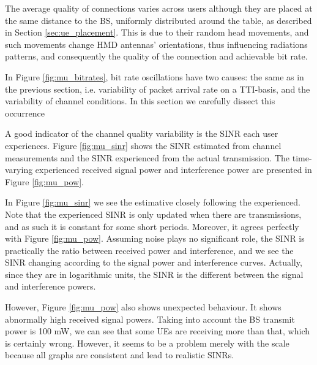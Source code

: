 The average quality of connections varies across users although they are placed at the same distance to the BS, uniformly distributed around the table, as described in Section \ref{sec:ue_placement}. This is due to their random head movements, and such movements change \acs{HMD} antennas' orientations, thus influencing radiations patterns, and consequently the quality of the connection and achievable bit rate.


In Figure \ref{fig:mu_bitrates}, bit rate oscillations have two causes: the same as in the previous section, i.e. variability of packet arrival rate on a TTI-basis, and the variability of channel conditions. In this section we carefully dissect this occurrence 

A good indicator of the channel quality variability is the SINR each user experiences. Figure \ref{fig:mu_sinr} shows the SINR estimated from channel measurements and the SINR experienced from the actual transmission. The time-varying experienced received signal power and interference power are presented in Figure \ref{fig:mu_pow}.




\vspace{.4cm}

In Figure \ref{fig:mu_sinr} we see the estimative closely following the experienced. Note that the experienced SINR is only updated when there are transmissions, and as such it is constant for some short periods. Moreover, it agrees perfectly with Figure \ref{fig:mu_pow}. Assuming noise plays no significant role, the SINR is practically the ratio between received power and interference, and we see the SINR changing according to the signal power and interference curves. Actually, since they are in logarithmic units, the SINR is the different between the signal and interference powers.

However, Figure \ref{fig:mu_pow} also shows unexpected behaviour. It shows abnormally high received signal powers. Taking into account the \acs{BS} transmit power is 100 mW, we can see that some \acsp{UE} are receiving more than that, which is certainly wrong. However, it seems to be a problem merely with the scale because all graphs are consistent and lead to realistic \acsp{SINR}.

